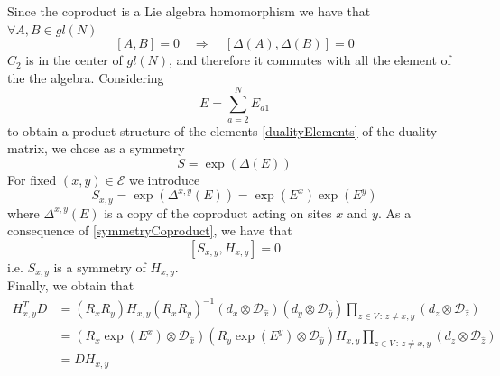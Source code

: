 \documentclass[11pt]{article}
\numberwithin{equation}{section}
\numberwithin{equation}{subsection}
\newcommand{\dd}{\mathcal{D}_{\widehat{x}}}
\begin{document}
Since the coproduct is a Lie algebra homomorphism we have that $\forall A,B\in gl(N)$
\begin{equation}\label{symmetryCoproduct}
    [A,B]=0\quad \Longrightarrow\quad \left[\Delta(A),\Delta(B)\right]=0
\end{equation}
 $C_{2}$ is in the center of $gl(N)$, and therefore it commutes with all the element of the the algebra. Considering 
\begin{equation}\label{equationE}
    E=\sum_{a=2}^{N}E_{a1}
\end{equation}
to obtain a product structure of the elements \eqref{dualityElements} of the duality matrix, we chose as a symmetry 
\begin{equation}
    S=\exp{(\Delta(E))}
\end{equation}
For fixed $(x,y)\in \mathcal{E}$ we introduce
\begin{equation}
    S_{x,y}=\exp{(\Delta^{x,y}(E))}=\exp{(E^{x})}\exp{(E^{y})}
\end{equation}
where $\Delta^{x,y}(E)$ is a copy of the coproduct acting on sites $x$ and $y$. As a consequence of \eqref{symmetryCoproduct}, we have that 
\begin{equation}\label{symmetryH}
    \left[S_{x,y},H_{x,y}\right]=0
\end{equation}
i.e. $S_{x,y}$ is a symmetry of $H_{x,y}$. \\ Finally, we obtain that 
\begin{equation}
    \begin{split}
        H_{x,y}^{T}D&=(R_{x}R_{y})H_{x,y}(R_{x}R_{y})^{-1}\left(d_{x}\otimes\dd\right)\left(d_{y}\otimes\mathcal{D}_{\widehat{y}}\right)\prod_{z\in V\,:\, z\neq x,y}\left(d_{z}\otimes \mathcal{D}_{\widehat{z}}\right)
        \\&=\left(R_{x}\exp{(E^{x})}\otimes \dd\right)\left(R_{y}\exp{(E^{y})}\otimes \mathcal{D}_{\widehat{y}}\right)H_{x,y}\prod_{z\in V\,:\, z\neq x,y}\left(d_{z}\otimes \mathcal{D}_{\widehat{z}}\right)
        \\&=
        DH_{x,y}
    \end{split}
\end{equation}
\end{document}
